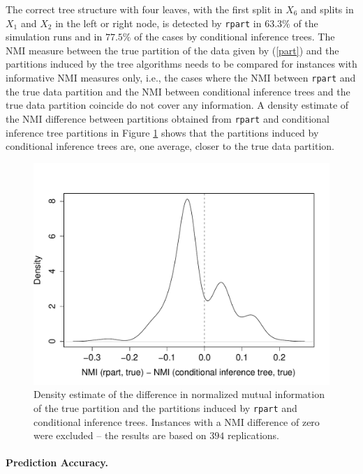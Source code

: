 The correct tree structure with four leaves, with the first split in $X_6$ and splits in
$X_1$ and $X_2$ in the left or right node, is detected by \texttt{rpart} in
$63.3\%$ of the simulation runs and in $77.5\%$ of the cases by conditional
inference trees. The NMI measure between the true partition of the data given by (\ref{part})
and the partitions induced by the tree algorithms needs to be compared for
instances with informative NMI measures only, i.e., the cases
where the NMI between \texttt{rpart} and the true data partition and the NMI
between conditional inference trees and the true data partition coincide do
not cover any information. A
density estimate of the NMI difference between partitions obtained from
\texttt{rpart} and
conditional inference tree partitions in Figure \ref{density} shows that the
partitions induced by conditional inference trees are, one average, closer
to the true data partition. 

\begin{figure}[t]
\begin{center}
\includegraphics[width = \textwidth]{nmisim}
\caption{Density estimate of the difference in normalized mutual information
         of the true partition and the partitions induced by \texttt{rpart}
         and conditional inference trees. Instances with a NMI difference of
         zero were excluded -- the results are based on $394$ 
         replications. \label{density}}
\end{center}
\end{figure}


\paragraph{Prediction Accuracy.}

